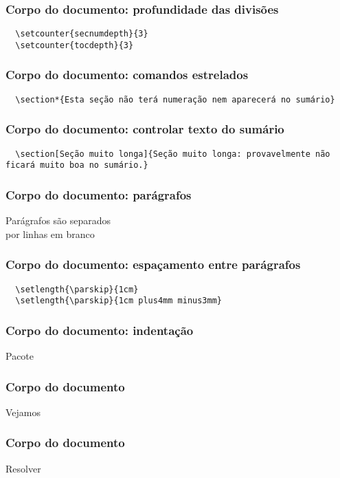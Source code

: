 \begin{frame}[fragile]
  \frametitle{Corpo do documento: profundidade das divisões}
  \begin{verbatim}
  \setcounter{secnumdepth}{3}
  \setcounter{tocdepth}{3}
  \end{verbatim}
\end{frame}

\begin{frame}[fragile]
  \frametitle{Corpo do documento: comandos estrelados}
  \begin{verbatim}
  \section*{Esta seção não terá numeração nem aparecerá no sumário}
  \end{verbatim}
\end{frame}

\begin{frame}[fragile]
  \frametitle{Corpo do documento: controlar texto do sumário}
  \begin{verbatim}
  \section[Seção muito longa]{Seção muito longa: provavelmente não ficará muito boa no sumário.}
  \end{verbatim}
\end{frame}

\begin{frame}
  \frametitle{Corpo do documento: parágrafos}
  \LARGE
  Parágrafos são separados\\
  por linhas em branco
\end{frame}

\begin{frame}[fragile]
  \frametitle{Corpo do documento: espaçamento entre parágrafos}
  \begin{verbatim}
  \setlength{\parskip}{1cm}
  \setlength{\parskip}{1cm plus4mm minus3mm}
  \end{verbatim}
\end{frame}

\begin{frame}
  \frametitle{Corpo do documento: indentação}
  \LARGE
  Pacote 
\end{frame}

\begin{frame}
  \frametitle{Corpo do documento}
  \huge
  Vejamos 
\end{frame}

\begin{frame}
  \frametitle{Corpo do documento}
  \huge
  Resolver 
\end{frame}
